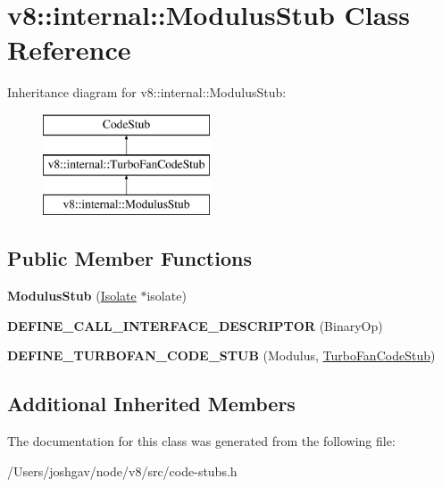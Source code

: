 \hypertarget{classv8_1_1internal_1_1_modulus_stub}{}\section{v8\+:\+:internal\+:\+:Modulus\+Stub Class Reference}
\label{classv8_1_1internal_1_1_modulus_stub}
Inheritance diagram for v8\+:\+:internal\+:\+:Modulus\+Stub\+:\begin{figure}[H]
\begin{center}
\leavevmode
\includegraphics[height=3.000000cm]{classv8_1_1internal_1_1_modulus_stub}
\end{center}
\end{figure}
\subsection*{Public Member Functions}
\begin{DoxyCompactItemize}
\item 
{\bfseries Modulus\+Stub} (\hyperlink{classv8_1_1internal_1_1_isolate}{Isolate} $\ast$isolate)\hypertarget{classv8_1_1internal_1_1_modulus_stub_a975c462c2e9d0aa960305f3e3777016f}{}\label{classv8_1_1internal_1_1_modulus_stub_a975c462c2e9d0aa960305f3e3777016f}

\item 
{\bfseries D\+E\+F\+I\+N\+E\+\_\+\+C\+A\+L\+L\+\_\+\+I\+N\+T\+E\+R\+F\+A\+C\+E\+\_\+\+D\+E\+S\+C\+R\+I\+P\+T\+OR} (Binary\+Op)\hypertarget{classv8_1_1internal_1_1_modulus_stub_ab41ec989e676573880242939e2425342}{}\label{classv8_1_1internal_1_1_modulus_stub_ab41ec989e676573880242939e2425342}

\item 
{\bfseries D\+E\+F\+I\+N\+E\+\_\+\+T\+U\+R\+B\+O\+F\+A\+N\+\_\+\+C\+O\+D\+E\+\_\+\+S\+T\+UB} (Modulus, \hyperlink{classv8_1_1internal_1_1_turbo_fan_code_stub}{Turbo\+Fan\+Code\+Stub})\hypertarget{classv8_1_1internal_1_1_modulus_stub_a0e3a32adfa56616ab73ebfcaa06e0f44}{}\label{classv8_1_1internal_1_1_modulus_stub_a0e3a32adfa56616ab73ebfcaa06e0f44}

\end{DoxyCompactItemize}
\subsection*{Additional Inherited Members}


The documentation for this class was generated from the following file\+:\begin{DoxyCompactItemize}
\item 
/\+Users/joshgav/node/v8/src/code-\/stubs.\+h\end{DoxyCompactItemize}
